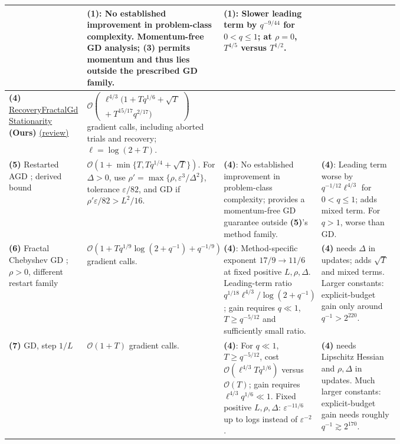 \begin{table}[tp]
\begin{threeparttable}
\begin{tabularx}{\linewidth}{@{}>{\raggedright\arraybackslash}p{0.20\linewidth}>{\raggedright\arraybackslash}p{0.32\linewidth}>{\raggedright\arraybackslash}p{0.25\linewidth}>{\raggedright\arraybackslash}X@{}}
& \textbf{(1)}: No established improvement in problem-class complexity. Momentum-free GD analysis; \textbf{(3)} permits momentum and thus lies outside the prescribed GD family.
& \textbf{(1)}: Slower leading term by $q^{-9/44}$ for $0<q\leq1$; at $\rho=0$, $T^{4/5}$ versus $T^{1/2}$. \\
\midrule
\textbf{(4)} \href{https://github.com/k3nfalt/longtails/blob/main/LongTails/Theorems/RecoveryFractalGdStationarity.lean}{Recovery\allowbreak Fractal\allowbreak Gd\allowbreak Stationarity} \textbf{(Ours)} \href{https://github.com/k3nfalt/longtails/blob/main/scripts/reviews/RecoveryFractalGdStationarity.md}{(review)}
& $\mathcal{O}\!\left(\begin{gathered}\ell^{4/3}\bigl(1+Tq^{1/6}+\sqrt T\\ {}+T^{15/17}q^{2/17}\bigr)\end{gathered}\right)$ gradient calls, including aborted trials and recovery; $\ell=\log(2+T)$. & & \\
\midrule
\textbf{(5)} Restarted AGD \citep[Thm.~1, v4]{shlgLiLinV4}; derived bound
& $\mathcal{O}\!\left(1+\min\{T,Tq^{1/4}+\sqrt T\}\right)$. For $\Delta>0$, use $\rho'=\max\{\rho,\varepsilon^3/\Delta^2\}$, tolerance $\varepsilon/82$, and GD if $\rho'\varepsilon/82>L^2/16$.
& \textbf{(4)}: No established improvement in problem-class complexity; provides a momentum-free GD guarantee outside \textbf{(5)}'s method family.
& \textbf{(4)}: Leading term worse by $q^{-1/12}\ell^{4/3}$ for $0<q\le1$; adds mixed term. For $q>1$, worse than GD. \\
\midrule
\textbf{(6)} Fractal Chebyshev GD \citep{recoveryFractalRepository}; $\rho>0$, different restart family
& $\mathcal{O}\!\left(1+Tq^{1/9}\log(2+q^{-1})+q^{-1/9}\right)$ gradient calls.
& \textbf{(4)}: Method-specific exponent $17/9\to11/6$ at fixed positive $L,\rho,\Delta$. Leading-term ratio $q^{1/18}\ell^{4/3}/\log(2+q^{-1})$; gain requires $q\ll1$, $T\ge q^{-5/12}$ and sufficiently small ratio.
& \textbf{(4)} needs $\Delta$ in updates; adds $\sqrt T$ and mixed terms. Larger constants: explicit-budget gain only around $q^{-1}>2^{220}$. \\
\midrule
\textbf{(7)} GD, step $1/L$ \citep[\S1.2.3]{hlgsNesterov2018}
& $\mathcal{O}(1+T)$ gradient calls.
& \textbf{(4)}: For $q\ll1$, $T\ge q^{-5/12}$, cost $\mathcal{O}(\ell^{4/3}Tq^{1/6})$ versus $\mathcal{O}(T)$; gain requires $\ell^{4/3}q^{1/6}\ll1$. Fixed positive $L,\rho,\Delta$: $\varepsilon^{-11/6}$ up to logs instead of $\varepsilon^{-2}$.
& \textbf{(4)} needs Lipschitz Hessian and $\rho,\Delta$ in updates. Much larger constants: explicit-budget gain needs roughly $q^{-1}\gtrsim2^{170}$. \\

\end{tabularx}
\end{threeparttable}
\end{table}
